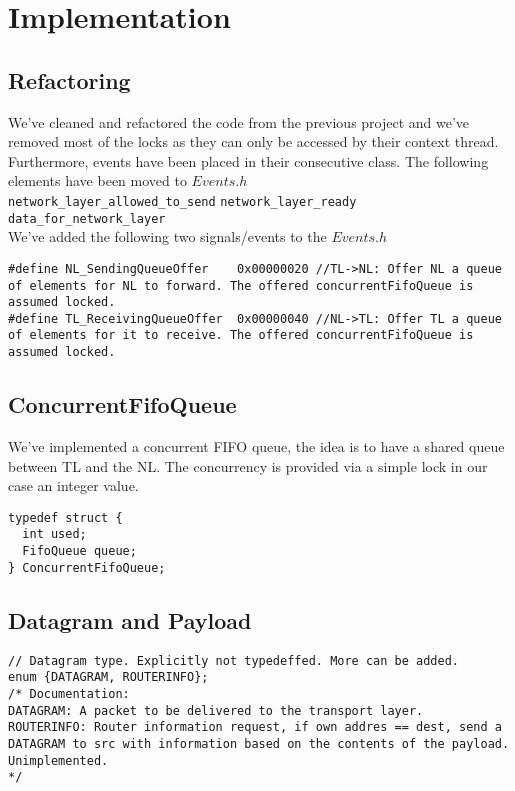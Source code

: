 \section{Implementation}

\subsection{Refactoring}

We've cleaned and refactored the code from the previous project and we've removed most of the locks as they can only be accessed by their context thread.
Furthermore, events have been placed in their consecutive class.
The following elements have been moved to $Events.h$
\break
\\
\texttt{network\_layer\_allowed\_to\_send}
\break
\texttt{network\_layer\_ready}
\break
\texttt{data\_for\_network\_layer}
\\

We've added the following two signals/events to the $Events.h$

\begin{lstlisting}
#define NL_SendingQueueOffer    0x00000020 //TL->NL: Offer NL a queue of elements for NL to forward. The offered concurrentFifoQueue is assumed locked.
#define TL_ReceivingQueueOffer  0x00000040 //NL->TL: Offer TL a queue of elements for it to receive. The offered concurrentFifoQueue is assumed locked.
\end{lstlisting}


\subsection{ConcurrentFifoQueue}

We've implemented a concurrent FIFO queue, the idea is to have a shared queue between TL and the NL.
The concurrency is provided via a simple lock in our case an integer value.
\begin{lstlisting}
typedef struct {
  int used;
  FifoQueue queue;
} ConcurrentFifoQueue;
\end{lstlisting}



\subsection{Datagram and Payload}

\begin{lstlisting}
// Datagram type. Explicitly not typedeffed. More can be added.
enum {DATAGRAM, ROUTERINFO};
/* Documentation:
DATAGRAM: A packet to be delivered to the transport layer.
ROUTERINFO: Router information request, if own addres == dest, send a DATAGRAM to src with information based on the contents of the payload. Unimplemented.
*/
\end{lstlisting}


